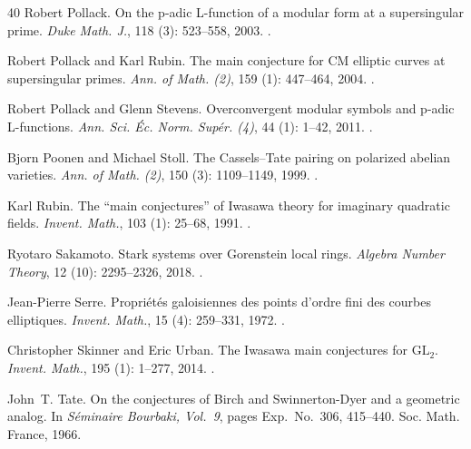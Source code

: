 \documentclass[11pt]{article}
\theoremstyle{definition}
\begin{document}
\begin{thebibliography}{40}
Robert Pollack.
\newblock On the p-adic {L}-function of a modular form at a supersingular prime.
\newblock \emph{Duke Math. J.}, 118 (3): 523--558, 2003.
\newblock {}.

Robert Pollack and Karl Rubin.
\newblock The main conjecture for {CM} elliptic curves at supersingular primes.
\newblock \emph{Ann. of Math. (2)}, 159 (1): 447--464, 2004.
\newblock {}.

Robert Pollack and Glenn Stevens.
\newblock Overconvergent modular symbols and p-adic {L}-functions.
\newblock \emph{Ann. Sci. \'Ec. Norm. Sup\'er. (4)}, 44 (1): 1--42, 2011.
\newblock {}.

Bjorn Poonen and Michael Stoll.
\newblock The {Cassels--Tate} pairing on polarized abelian varieties.
\newblock \emph{Ann. of Math. (2)}, 150 (3): 1109--1149, 1999.
\newblock {}.

Karl Rubin.
\newblock The ``main conjectures'' of {Iwasawa} theory for imaginary quadratic fields.
\newblock \emph{Invent. Math.}, 103 (1): 25--68, 1991.
\newblock {}.

Ryotaro Sakamoto.
\newblock Stark systems over {Gorenstein} local rings.
\newblock \emph{Algebra Number Theory}, 12 (10): 2295--2326, 2018.
\newblock {}.

Jean-Pierre Serre.
\newblock Propri\'et\'es galoisiennes des points d'ordre fini des courbes elliptiques.
\newblock \emph{Invent. Math.}, 15 (4): 259--331, 1972.
\newblock {}.

Christopher Skinner and Eric Urban.
\newblock The {Iwasawa} main conjectures for {$\mathrm{GL}_2$}.
\newblock \emph{Invent. Math.}, 195 (1): 1--277, 2014.
\newblock {}.

John~T. Tate.
\newblock On the conjectures of {Birch} and {Swinnerton-Dyer} and a geometric analog.
\newblock In \emph{S\'eminaire Bourbaki, Vol.~9}, pages Exp.~No.~306, 415--440. Soc. Math. France, 1966.


\end{thebibliography}
\end{document}
